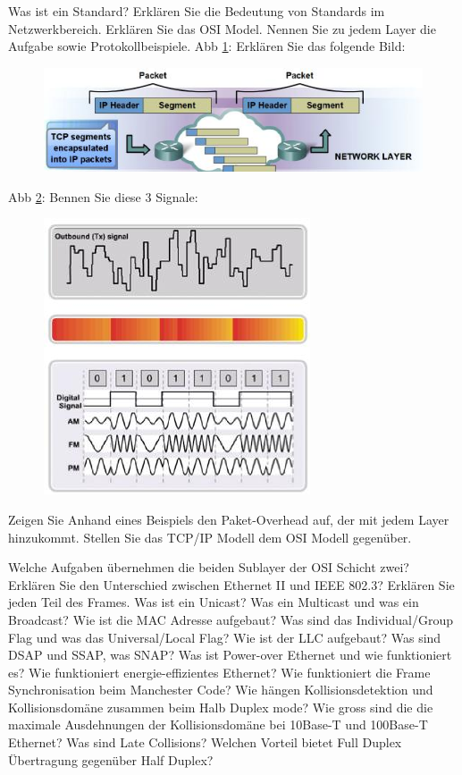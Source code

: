 \documentclass[ngerman,a4paper,12pt]{scrreprt}
\begin{document}
	\li Was ist ein Standard? Erklären Sie die Bedeutung von Standards im Netzwerkbereich.
	\li Erklären Sie das OSI Model. Nennen Sie zu jedem Layer die Aufgabe sowie Protokollbeispiele.
	\li Abb \ref{tcp}: Erklären Sie das folgende Bild:  	
		\begin{figure}[H]
			\centering
			\caption{}
			\includegraphics[scale=0.60]{img/R1.3.jpg}
			\label{tcp}
		\end{figure}	
	\li Abb \ref{signals}: Bennen Sie diese 3 Signale: 	
		\begin{figure}[H]
			\centering
			\caption{}
			\includegraphics[scale=0.60]{img/R1.4.jpg}
			\label{signals}
		\end{figure} 
	\li Zeigen Sie Anhand eines Beispiels den Paket-Overhead auf, der mit jedem Layer hinzukommt.
	\li Stellen Sie das TCP/IP Modell dem OSI Modell gegenüber.
\olS


\olR
	\li Welche Aufgaben übernehmen die beiden Sublayer der OSI Schicht zwei?
	\li Erklären Sie den Unterschied zwischen Ethernet II und IEEE 802.3? Erklären Sie jeden Teil des Frames.
	\li Was ist ein Unicast? Was ein Multicast und was ein Broadcast?
	\li Wie ist die MAC Adresse aufgebaut? Was sind das Individual/Group Flag und was das Universal/Local Flag?
	\li Wie ist der LLC aufgebaut? Was sind DSAP und SSAP, was SNAP?
	\li Was ist Power-over Ethernet und wie funktioniert es?
	\li Wie funktioniert energie-effizientes Ethernet?
	\li Wie funktioniert die Frame Synchronisation beim Manchester Code?
	\li Wie hängen Kollisionsdetektion und Kollisionsdomäne zusammen beim Halb Duplex mode?
	\li Wie gross sind die die maximale Ausdehnungen der Kollisionsdomäne bei 10Base-T und 100Base-T Ethernet? Was sind Late Collisions?
	\li Welchen Vorteil bietet Full Duplex Übertragung gegenüber Half Duplex?
\olS
\end{document}
